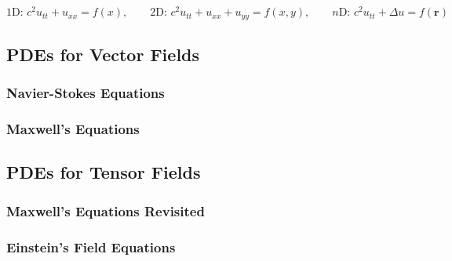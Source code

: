 \begin{equation}
1\text{D:  } c^2 u_{tt} + u_{xx} = f(x), \qquad 
2\text{D:  } c^2 u_{tt} + u_{xx} + u_{yy} = f(x,y), \qquad 
n\text{D:  } c^2 u_{tt} + \Delta u = f(\mathbf{r})
\end{equation}








\subsection{PDEs for Vector Fields}

\subsubsection{Navier-Stokes Equations}

\subsubsection{Maxwell's Equations}


\subsection{PDEs for Tensor Fields}

\subsubsection{Maxwell's Equations Revisited}

\subsubsection{Einstein's Field Equations}




\begin{comment}

\end{comment}